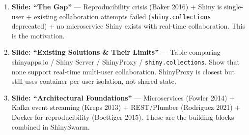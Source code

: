 \documentclass[12pt,a4paper]{article}
\begin{document}
\begin{enumerate}
  \item \textbf{Slide: ``The Gap''} --- Reproducibility crisis (Baker 2016) + Shiny is single-user + existing collaboration attempts failed (\texttt{shiny.collections} deprecated) + no microservice Shiny exists with real-time collaboration. This is the motivation.
  
  \item \textbf{Slide: ``Existing Solutions \& Their Limits''} --- Table comparing shinyapps.io / Shiny Server / ShinyProxy / \texttt{shiny.collections}. Show that none support real-time multi-user collaboration. ShinyProxy is closest but still uses container-per-user isolation, not shared state.
  
  \item \textbf{Slide: ``Architectural Foundations''} --- Microservices (Fowler 2014) + Kafka event streaming (Kreps 2013) + REST/Plumber (Rodriguez 2021) + Docker for reproducibility (Boettiger 2015). These are the building blocks combined in ShinySwarm.
\end{enumerate}
\end{document}
